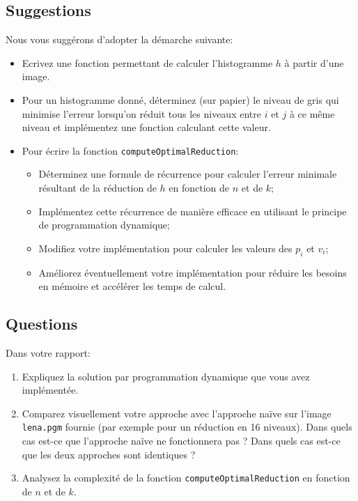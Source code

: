 \documentclass[a4paper,10pt]{article}
\begin{document}

\subsection*{Suggestions}

Nous vous suggérons d'adopter la démarche suivante:
\begin{itemize}
\item Ecrivez une fonction permettant de calculer l'histogramme $h$ à
  partir d'une image.
\item Pour un histogramme donné, déterminez (sur papier) le niveau de gris qui minimise l'erreur lorsqu'on réduit tous les niveaux entre $i$ et $j$ à ce même niveau et implémentez une fonction calculant cette valeur.
\item Pour écrire la fonction \texttt{computeOptimalReduction}:
\begin{itemize}
\item Déterminez une formule de récurrence pour calculer l'erreur minimale résultant de la réduction de $h$ en fonction de $n$ et de $k$;
\item Implémentez cette récurrence de manière efficace en utilisant le principe de programmation dynamique;
\item Modifiez votre implémentation pour calculer les valeurs des $p_i$ et $v_i$;
\item Améliorez éventuellement votre implémentation pour réduire les
  besoins en mémoire et accélérer les temps de calcul.
\end{itemize}
\end{itemize}

\subsection*{Questions}

Dans votre rapport:
\begin{enumerate}
\item Expliquez la solution par programmation dynamique que vous avez implémentée.
\item Comparez visuellement votre approche avec l'approche naïve sur l'image \texttt{lena.pgm} fournie (par exemple pour un réduction en 16 niveaux). Dans quels cas est-ce que l'approche naïve ne fonctionnera pas ? Dans quels cas est-ce que les deux approches sont identiques ?
\item Analysez la complexité de la fonction \texttt{computeOptimalReduction} en fonction de $n$ et de $k$.
\end{enumerate}
\end{document}
